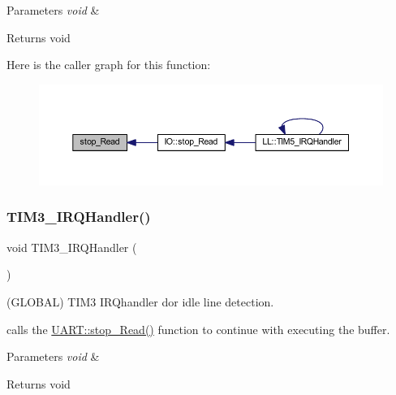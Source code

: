 \begin{DoxyParams}{Parameters}
{\em void} & \\
\hline
\end{DoxyParams}
\begin{DoxyReturn}{Returns}
void 
\end{DoxyReturn}
Here is the caller graph for this function\+:\nopagebreak
\begin{figure}[H]
\begin{center}
\leavevmode
\includegraphics[width=350pt]{namespace_u_a_r_t_a996ffefd3d2ce666720596342364db03_icgraph}
\end{center}
\end{figure}
\mbox{\label{namespace_u_a_r_t_ac8e51d2183b5230cbd5481f8867adce9}} 
\subsubsection{\texorpdfstring{T\+I\+M3\+\_\+\+I\+R\+Q\+Handler()}{TIM3\_IRQHandler()}}
{\footnotesize\ttfamily void T\+I\+M3\+\_\+\+I\+R\+Q\+Handler (\begin{DoxyParamCaption}\item[{void}]{ }\end{DoxyParamCaption})}



(G\+L\+O\+B\+AL) T\+I\+M3 I\+R\+Qhandler dor idle line detection. 

calls the \mbox{\hyperlink{namespace_u_a_r_t_a996ffefd3d2ce666720596342364db03}{U\+A\+R\+T\+::stop\+\_\+\+Read()}} function to continue with executing the buffer.


\begin{DoxyParams}{Parameters}
{\em void} & \\
\hline
\end{DoxyParams}
\begin{DoxyReturn}{Returns}
void 
\end{DoxyReturn}
\mbox{\label{namespace_u_a_r_t_a0ca6fd0e6f77921dd1123539857ba0a8}} 
